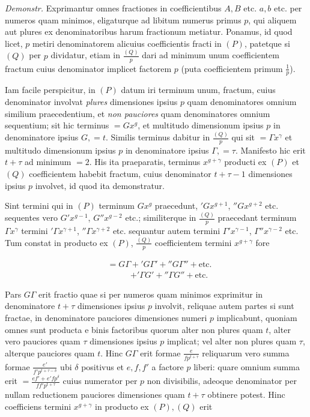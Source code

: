 \emph{Demonstr.} Exprimantur omnes fractiones in coefficientibus $A,B$ etc. $a,b$ etc. per numeros quam minimos, eligaturque ad libitum numerus primus $p$, qui aliquem aut plures ex denominatoribus harum fractionum metiatur. Ponamus, id quod licet, $p$ metiri denominatorem alicuius coefficientis fracti in $(P)$, patetque si $(Q)$ per $p$ dividatur, etiam in $\frac{(Q)}{p}$ dari ad minimum unum coefficientem fractum cuius denominator implicet factorem $p$ (puta coefficientem primum $\frac{1}{p}$).


Iam facile perspicitur, in $(P)$ datum iri terminum unum, fractum, cuius denominator involvat \emph{plures} dimensiones ipsius $p$ quam denominatores omnium similium praecedentium, et \emph{non pauciores} quam denominatores omnium sequentium; sit hic terminus $=Gx^g$, et multitudo dimensionum ipsius $p$ in denominatore ipsius $G,=t$. Similis terminus dabitur in $\frac{(Q)}{p}$ qui sit $=\varGamma x^\gamma$ et multitudo dimensionum ipsius $p$ in denominatore ipsius $\varGamma,=\tau$. Manifesto hic erit $t+\tau$ ad minimum $=2$. His ita praeparatis, terminus $x^{g+\gamma}$ producti ex $(P)$ et $(Q)$ coefficientem habebit fractum, cuius denominator $t+\tau-1$ dimensiones ipsius $p$ involvet, id quod ita demonstratur.

Sint termini qui in $(P)$ terminum $Gx^g$ praecedunt, ${}'Gx^{g+1}$, ${}''Gx^{g+2}$ etc. sequentes vero $G'x^{g-1}$, $G''x^{g-2}$ etc.; similiterque in $\frac{(Q)}{p}$ praecedant terminum $\varGamma x^\gamma$ termini ${}'\varGamma x^{\gamma+1}$, ${}''\varGamma x^{\gamma+2}$ etc. sequantur autem termini $\varGamma'x^{\gamma-1}$, $\varGamma''x^{\gamma-2}$ etc. Tum constat in producto ex $(P)$, $\frac{(Q)}{p}$ coefficientem termini $x^{g+\gamma}$ fore

\[
\begin{aligned}
&=G\varGamma+{}'G\varGamma'+{}''G\varGamma''+\text{etc.}\\
&\phantom{=G\varGamma}\mathord{+}{}'\varGamma G'+{}''\varGamma G''+\text{etc.}
\end{aligned}
\]

Pars $G\varGamma$ erit fractio quae si per numeros quam minimos exprimitur in denominatore $t+\tau$ dimensiones ipsius $p$ involvit, reliquae autem partes si sunt fractae, in denominatore pauciores dimensiones numeri $p$ implicabunt, quoniam omnes sunt producta e binis factoribus quorum alter non plures quam $t$, alter vero pauciores quam $\tau$ dimensiones ipsius $p$ implicat; vel alter non plures quam $\tau$, alterque pauciores quam $t$. Hinc $G\varGamma$ erit formae $\frac{e}{fp^{t+\tau}}$ reliquarum vero summa formae $\frac{e'}{f'p^{t+\tau-\delta}}$ ubi $\delta$ positivus et $e,f,f'$ a factore $p$ liberi: quare omnium summa erit $=\frac{ef'+e'fp^\delta}{ff'p^{t+\tau}}$ cuius numerator per $p$ non divisibilis, adeoque denominator per nullam reductionem pauciores dimensiones quam $t+\tau$ obtinere potest. Hinc coefficiens termini $x^{g+\gamma}$ in producto ex $(P),(Q)$ erit

